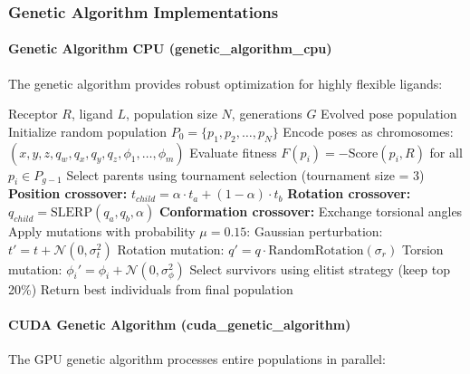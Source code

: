 \documentclass[11pt,a4paper]{article}
\begin{document}
\subsubsection{Genetic Algorithm Implementations}

\paragraph{Genetic Algorithm CPU (genetic\_algorithm\_cpu)}

The genetic algorithm provides robust optimization for highly flexible ligands:

\begin{algorithm}[H]
\caption{Genetic Algorithm CPU Docking}
\begin{algorithmic}[1]
\Require Receptor $R$, ligand $L$, population size $N$, generations $G$
\Ensure Evolved pose population
\State Initialize random population $P_0 = \{p_1, p_2, \ldots, p_N\}$
\State Encode poses as chromosomes: $(x, y, z, q_w, q_x, q_y, q_z, \phi_1, \ldots, \phi_m)$
    \State Evaluate fitness $F(p_i) = -\text{Score}(p_i, R)$ for all $p_i \in P_{g-1}$
    \State Select parents using tournament selection (tournament size = 3)
        \State \textbf{Position crossover:} $t_{child} = \alpha \cdot t_a + (1-\alpha) \cdot t_b$
        \State \textbf{Rotation crossover:} $q_{child} = \text{SLERP}(q_a, q_b, \alpha)$
        \State \textbf{Conformation crossover:} Exchange torsional angles
    \EndFor
    \State Apply mutations with probability $\mu = 0.15$:
    \State \quad Gaussian perturbation: $t' = t + \mathcal{N}(0, \sigma_t^2)$
    \State \quad Rotation mutation: $q' = q \cdot \text{RandomRotation}(\sigma_r)$
    \State \quad Torsion mutation: $\phi_i' = \phi_i + \mathcal{N}(0, \sigma_\phi^2)$
    \State Select survivors using elitist strategy (keep top 20\%)
\EndFor
\State Return best individuals from final population
\end{algorithmic}
\end{algorithm}

\paragraph{CUDA Genetic Algorithm (cuda\_genetic\_algorithm)}

The GPU genetic algorithm processes entire populations in parallel:
\end{document}
